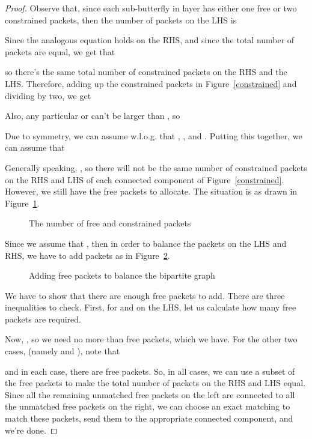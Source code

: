 \documentclass[12pt]{article}
\begin{document}
\begin{proof}
Observe that, since each sub-butterfly in layer  has
either one free or two constrained packets, then the number of
packets on the LHS is 

Since the analogous
equation holds on the RHS, and since the total number of packets are equal,
we get that 

so there's the same total number of constrained
packets on the RHS and the LHS.  Therefore, adding up the 
constrained packets in Figure~\ref{constrained} and dividing by two, we get

Also, any particular  or  can't be larger than 
, so 

Due to symmetry, we can assume w.l.o.g. that ,
, and .  Putting this together,
we can assume that


Generally speaking, , so there will not be the 
same number of constrained packets on the RHS and LHS of each
connected component of Figure~\ref{constrained}.  However, we
still have the free packets to allocate.  The situation is as drawn in
Figure~\ref{free 1}.
\begin{figure}[ht] 
\centerline{ \hspace{.4in}  }
\caption{The number of free and constrained packets} 
\label{free 1}
\end{figure}
Since we assume that , then 
in order to balance the packets on the LHS and RHS, we have to
add packets as in Figure~\ref{free 2}.
\begin{figure}[ht]
\centerline{ \hspace{.4in}  }
\caption{Adding free packets to balance the bipartite graph}
\label{free 2}
\end{figure}
We have to show that there are enough free packets to add.
There are three inequalities to check.  First,
for  and  on the LHS,
let us calculate how many free packets are required.

Now, , so we need no more than  
free packets, which we have.
For the other two cases, (namely  and ), note that

and in each case, there are  free packets.
So, in all cases, we can use a subset of the free packets to
make the total number of packets on the RHS and LHS equal.
Since all the remaining unmatched free packets on the left are
connected to all the unmatched free packets on the right, we can
choose an exact matching to match these packets, send them to
the appropriate connected component,
and we're done.
\end{proof}
\end{document}
